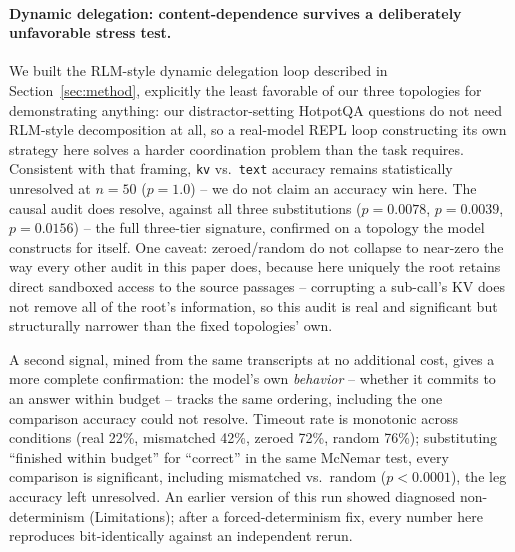 \documentclass[11pt]{article}
\begin{document}
\paragraph{Dynamic delegation: content-dependence survives a deliberately
unfavorable stress test.} We built the RLM-style dynamic delegation loop
described in Section~\ref{sec:method}, explicitly the least favorable of
our three topologies for demonstrating anything: our distractor-setting
HotpotQA questions do not need RLM-style decomposition at all, so a
real-model REPL loop constructing its own strategy here solves a harder
coordination problem than the task requires. Consistent with that
framing, \texttt{kv} vs.\ \texttt{text} accuracy remains statistically
unresolved at $n=50$ ($p=1.0$) -- we do not claim an accuracy win here.
The causal audit does resolve, against all three substitutions
($p=0.0078$, $p=0.0039$, $p=0.0156$) -- the full three-tier signature,
confirmed on a topology the model constructs for itself. One caveat:
zeroed/random do not collapse to near-zero the way every other audit in
this paper does, because here uniquely the root retains direct sandboxed
access to the source passages -- corrupting a sub-call's KV does not
remove all of the root's information, so this audit is real and
significant but structurally narrower than the fixed topologies' own.

A second signal, mined from the same transcripts at no additional cost,
gives a more complete confirmation: the model's own \emph{behavior} --
whether it commits to an answer within budget -- tracks the same
ordering, including the one comparison accuracy could not resolve.
Timeout rate is monotonic across conditions (real 22\%, mismatched 42\%,
zeroed 72\%, random 76\%); substituting ``finished within budget'' for
``correct'' in the same McNemar test, every comparison is significant,
including mismatched vs.\ random ($p<0.0001$), the leg accuracy left
unresolved. An earlier version of this run showed diagnosed
non-determinism (Limitations); after a forced-determinism fix, every
number here reproduces bit-identically against an independent rerun.
\end{document}
